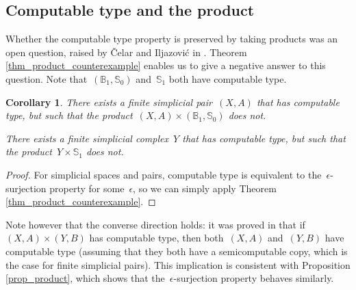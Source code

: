 \documentclass[english,11pt]{article}
\theoremstyle{plain}
\newtheorem{corollary}{Corollary}[section]
\theoremstyle{remark}
\theoremstyle{definition}
\newcommand{\odd}[1]{\partial_\mathrm{odd}(#1)}
\newcommand{\Sp}{\mathbb{S}}
\newcommand{\BB}{\mathbb{B}}
\newcommand{\C}[1]{\mathsf{C}(#1)}%
\newcommand{\OC}[1]{\mathsf{OC}(#1)}%
\begin{document}
%
%

\subsection{Computable type and the product}
Whether the computable type property is preserved by taking products was an open question, raised by \v{C}elar and Iljazovi\'{c} in \cite{CI21}. Theorem \ref{thm_product_counterexample} enables us to give a negative answer  to this question. Note that~$(\BB_1,\Sp_0)$ and~$\Sp_1$ both have computable type.

\begin{corollary}\label{cor_ct_product}
There exists a finite simplicial pair~$(X,A)$ that has computable type, but such that the product~$(X,A)\times (\BB_1,\Sp_0)$ does not.

There exists a finite simplicial complex~$Y$ that has computable type, but such that the product~$Y\times \Sp_1$ does not.
\end{corollary}
\begin{proof}
For simplicial spaces and pairs, computable type is equivalent to the~$\epsilon$-surjection property for some~$\epsilon$, so we can simply apply Theorem \ref{thm_product_counterexample}.
\end{proof}

Note however that the converse direction holds: it was proved in \cite{AH22c} that if~$(X,A)\times (Y,B)$ has computable type, then both~$(X,A)$ and~$(Y,B)$ have computable type (assuming that they both have a semicomputable copy, which is the case for finite simplicial pairs). This implication is consistent with Proposition \ref{prop_product}, which shows that the~$\epsilon$-surjection property behaves similarly.
\end{document}
